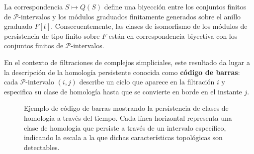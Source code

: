 \begin{corolario}
La correspondencia \( S \mapsto Q(S) \) define una biyección entre los conjuntos finitos de $\mathcal{P}$-intervalos y los módulos graduados finitamente generados sobre el anillo graduado \( F[t] \). Consecuentemente, las clases de isomorfismo de los módulos de persistencia de tipo finito sobre \( F \) están en correspondencia biyectiva con los conjuntos finitos de $\mathcal{P}$-intervalos.
\end{corolario}

En el contexto de filtraciones de complejos simpliciales, este resultado da lugar a la descripción de la homología persistente conocida como \textbf{código de barras}: cada $\mathcal{P}$-intervalo $(i, j)$ describe un ciclo que aparece en la filtración $i$ y especifica su clase de homología hasta que se convierte en borde en el instante $j$.

\begin{figure}
	\label{fig:barcode}
	\centering
{}
\caption{Ejemplo de código de barras mostrando la persistencia de clases de homología a través del tiempo. Cada línea horizontal representa una clase de homología que persiste a través de un intervalo específico, indicando la escala a la que dichas características topológicas son detectables.}
\end{figure}


